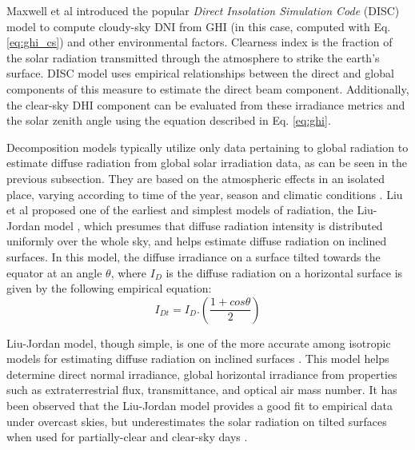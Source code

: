 \par Maxwell et al \cite{pvlib_disc} introduced the popular \textit{Direct Insolation Simulation Code} (DISC) model to compute cloudy-sky DNI from GHI (in this case, computed with Eq. \ref{eq:ghi_cs}) and other environmental factors. Clearness index is the fraction of the solar radiation transmitted through the atmosphere to strike the earth's surface. DISC model uses empirical relationships between the direct and global components of this measure to estimate the direct beam component. Additionally, the clear-sky DHI component can be evaluated from these irradiance metrics and the solar zenith angle using the equation described in Eq. \ref{eq:ghi}.

Decomposition models typically utilize only data pertaining to global radiation to estimate diffuse radiation from global solar irradiation data, as can be seen in the previous subsection. They are based on the atmospheric effects in an isolated place, varying according to time of the year, season and climatic conditions \cite{pvlib_liujordan}. Liu et al proposed one of the earliest and simplest models of radiation, the Liu-Jordan model \cite{pvlib_liujordan2}, which presumes that diffuse radiation intensity is distributed uniformly over the whole sky, and helps estimate diffuse radiation on inclined surfaces. In this model, the diffuse irradiance on a surface tilted towards the equator at an angle $\theta$, where $I_D$ is the diffuse radiation on a horizontal surface is given by the following empirical equation:
\begin{equation}\label{eq:lj_dhi}
    I_{Dt} = I_D . (\frac{1 + cos\theta}{2})
\end{equation}

Liu-Jordan model, though simple, is one of the more accurate among isotropic models for estimating diffuse radiation on inclined surfaces \cite{pvlib_liujordan3}. This model helps determine direct normal irradiance, global horizontal irradiance from properties such as extraterrestrial flux, transmittance, and optical air mass number. It has been observed that the Liu-Jordan model provides a good fit to empirical data under overcast skies, but underestimates the solar radiation on tilted surfaces when used for partially-clear and clear-sky days \cite{pvlib_liujordan4}.

